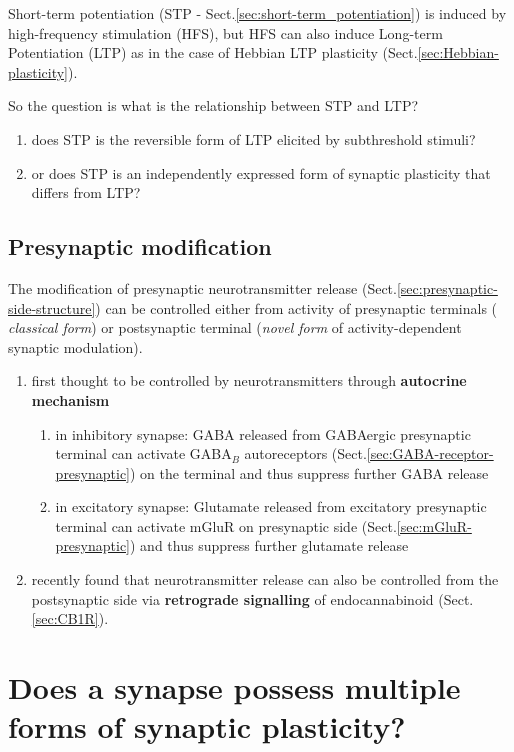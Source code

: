 Short-term potentiation (STP - Sect.\ref{sec:short-term_potentiation}) is
induced by high-frequency stimulation (HFS), but HFS can also induce Long-term
Potentiation (LTP) as in the case of Hebbian LTP plasticity
(Sect.\ref{sec:Hebbian-plasticity}).

So the question is what is the relationship between STP and LTP?
\begin{enumerate}
  \item does STP is the reversible form of LTP elicited by subthreshold stimuli?
  
  \item or does STP  is an independently expressed form of synaptic plasticity
  that differs from LTP?
\end{enumerate}
\citep{schulz1997}

\subsection{Presynaptic modification}

The modification of presynaptic neurotransmitter release (Sect.\ref{sec:presynaptic-side-structure})
can be controlled either from activity of presynaptic terminals ({\it
classical form}) or postsynaptic terminal ({\it novel form} of
activity-dependent synaptic modulation).
\begin{enumerate}
  \item first thought to be controlled by neurotransmitters through {\bf
  autocrine mechanism}
  \begin{enumerate}
    \item in inhibitory synapse: GABA released from GABAergic presynaptic
    terminal can activate GABA$_B$ autoreceptors (Sect.\ref{sec:GABA-receptor-presynaptic})
    on the terminal and thus suppress further GABA release
    
    \item in excitatory synapse: Glutamate released from excitatory presynaptic
    terminal can activate mGluR on presynaptic side (Sect.\ref{sec:mGluR-presynaptic})
    and thus suppress further glutamate release
  \end{enumerate}
 
  
  \item recently found that neurotransmitter release can also be controlled from
  the postsynaptic side via {\bf retrograde signalling} of endocannabinoid
  (Sect.\ref{sec:CB1R}).
\end{enumerate}

\section{Does a synapse possess multiple forms of synaptic plasticity?}

